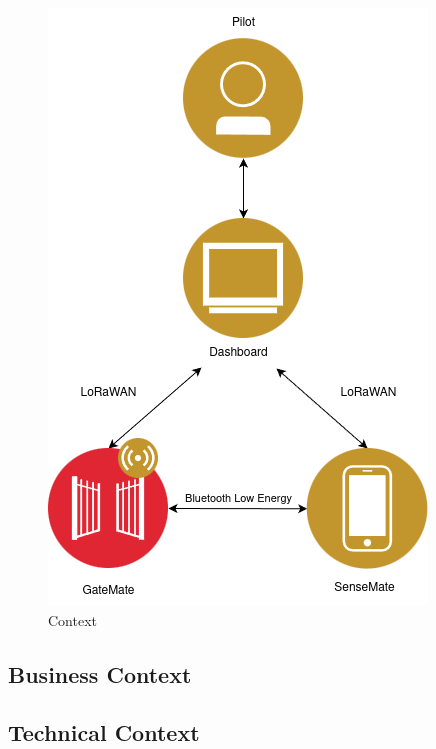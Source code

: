 \documentclass[
]{article}
\begin{document}
\begin{figure}[H]
  \centering
  \includegraphics[width=1 \textwidth]{images/context-diagramm.png}
  \caption{Context}
  \label{fig:context}
  
\end{figure}



\hypertarget{_business_context}{%
\subsection{Business Context}\label{_business_context}}


\hypertarget{_technical_context}{%
\subsection{Technical Context}\label{_technical_context}}
\end{document}
